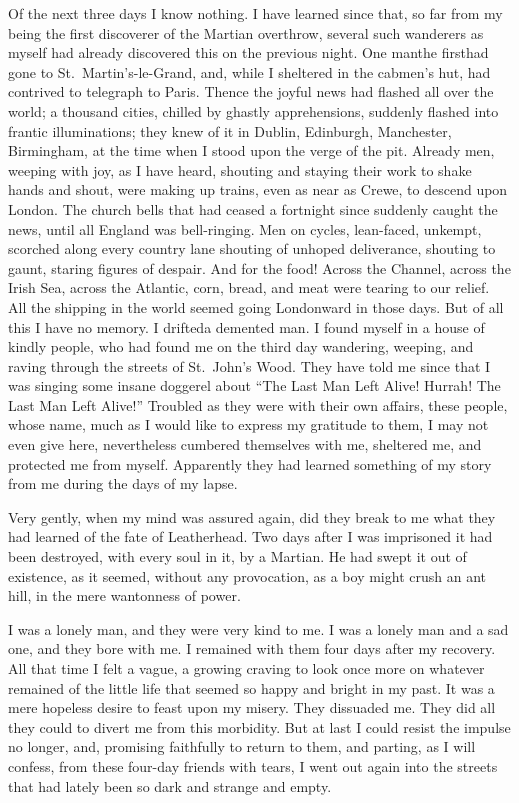 Of the next three days I know nothing. I have learned since that,
so far from my being the first discoverer of the Martian overthrow,
several such wanderers as myself had already discovered this on the
previous night. One man\dash{}the first\dash{}had gone to St.\ Martin's-le-Grand,
and, while I sheltered in the cabmen's hut, had
contrived to telegraph to Paris. Thence the joyful news had flashed
all over the world; a thousand cities, chilled by ghastly
apprehensions, suddenly flashed into frantic illuminations; they
knew of it in Dublin, Edinburgh, Manchester, Birmingham, at the
time when I stood upon the verge of the pit. Already men, weeping
with joy, as I have heard, shouting and staying their work to shake
hands and shout, were making up trains, even as near as Crewe, to
descend upon London. The church bells that had ceased a fortnight
since suddenly caught the news, until all England was bell-ringing.
Men on cycles, lean-faced, unkempt, scorched along every country
lane shouting of unhoped deliverance, shouting to gaunt, staring
figures of despair. And for the food! Across the Channel, across
the Irish Sea, across the Atlantic, corn, bread, and meat were
tearing to our relief. All the shipping in the world seemed going
Londonward in those days. But of all this I have no memory. I
drifted\dash{}a demented man. I found myself in a house of kindly
people, who had found me on the third day wandering, weeping, and
raving through the streets of St.\ John's Wood. They have told me
since that I was singing some insane doggerel about ``The Last Man
Left Alive! Hurrah! The Last Man Left Alive!'' Troubled as they were
with their own affairs, these people, whose name, much as I would
like to express my gratitude to them, I may not even give here,
nevertheless cumbered themselves with me, sheltered me, and
protected me from myself. Apparently they had learned something of
my story from me during the days of my lapse.

Very gently, when my mind was assured again, did they break to me
what they had learned of the fate of Leatherhead. Two days after I
was imprisoned it had been destroyed, with every soul in it, by a
Martian. He had swept it out of existence, as it seemed, without
any provocation, as a boy might crush an ant hill, in the mere
wantonness of power.

I was a lonely man, and they were very kind to me. I was a lonely
man and a sad one, and they bore with me. I remained with them four
days after my recovery. All that time I felt a vague, a growing
craving to look once more on whatever remained of the little life
that seemed so happy and bright in my past. It was a mere hopeless
desire to feast upon my misery. They dissuaded me. They did all
they could to divert me from this morbidity. But at last I could
resist the impulse no longer, and, promising faithfully to return
to them, and parting, as I will confess, from these four-day
friends with tears, I went out again into the streets that had
lately been so dark and strange and empty.

